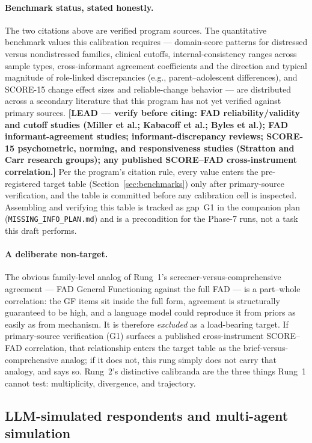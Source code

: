 \documentclass[12pt, letterpaper]{article}
\newcommand{\lead}[1]{\textcolor{red!65!black}{\textbf{[LEAD --- verify before citing: #1]}}}
\begin{document}
\paragraph{Benchmark status, stated honestly.} The two citations above are verified program sources. The quantitative benchmark values this calibration requires --- domain-score patterns for distressed versus nondistressed families, clinical cutoffs, internal-consistency ranges across sample types, cross-informant agreement coefficients and the direction and typical magnitude of role-linked discrepancies (e.g., parent--adolescent differences), and SCORE-15 change effect sizes and reliable-change behavior --- are distributed across a secondary literature that this program has not yet verified against primary sources. \lead{FAD reliability/validity and cutoff studies (Miller et al.; Kabacoff et al.; Byles et al.); FAD informant-agreement studies; informant-discrepancy reviews; SCORE-15 psychometric, norming, and responsiveness studies (Stratton and Carr research groups); any published SCORE--FAD cross-instrument correlation.} Per the program's citation rule, every value enters the pre-registered target table (Section~\ref{sec:benchmarks}) only after primary-source verification, and the table is committed before any calibration cell is inspected. Assembling and verifying this table is tracked as gap~G1 in the companion plan (\texttt{MISSING\_INFO\_PLAN.md}) and is a precondition for the Phase-7 runs, not a task this draft performs.

\paragraph{A deliberate non-target.} The obvious family-level analog of Rung~1's screener-versus-comprehensive agreement --- FAD General Functioning against the full FAD --- is a part--whole correlation: the GF items sit inside the full form, agreement is structurally guaranteed to be high, and a language model could reproduce it from priors as easily as from mechanism. It is therefore \emph{excluded} as a load-bearing target. If primary-source verification (G1) surfaces a published cross-instrument SCORE--FAD correlation, that relationship enters the target table as the brief-versus-comprehensive analog; if it does not, this rung simply does not carry that analogy, and says so. Rung~2's distinctive calibranda are the three things Rung~1 cannot test: multiplicity, divergence, and trajectory.

\subsection{LLM-simulated respondents and multi-agent simulation}
\label{sec:llmrespondents}
\end{document}
